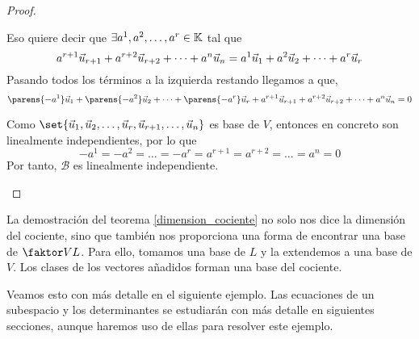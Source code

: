 \documentclass[../algebra_lineal.tex]{subfiles}
\begin{document}
\begin{proof}
\begin{enumerate}
        Eso quiere decir que $\exists {a}^{1}, {a}^{2}, \dots, {a}^{r} \in \mathbb{K}$ tal que
        \[
            a^{r+1}\vec{u}_{r+1} + a^{r+2}\vec{u}_{r+2} + \dots + a^{n}\vec{u}_{n} = {a}^{1}\vec{u}_{1}+{a}^{2}\vec{u}_{2}+\dots+{a}^{r}\vec{u}_{r}
        \] 
        Pasando todos los términos a la izquierda restando llegamos a que,
        \[
            \parens{-a^1}\vu_1 + \parens{-a^2}\vu_2 + \dots + \parens{-a^r}\vu_r + a^{r+1}\vu_{r+1} + a^{r+2}\vu_{r+2} + \dots + a^{n}\vu_{n} = 0
        \]

        Como $\set{\vlst{u}{r}, \vu_{r+1}, \dots, \vu_n}$ es base de $V$, entonces en concreto son linealmente independientes, por lo que
        \[
            -a^1=-a^2= \dots = -a^r=a^{r+1} = a^{r+2} = \dots = a^n = 0
        \]
        Por tanto, $\mathcal{B}$ es linealmente independiente.
    \end{enumerate}
\end{proof}

\begin{remark}
    La demostración del teorema \ref{dimension_cociente} no solo nos dice la dimensión del cociente, sino que también nos proporciona una forma de encontrar una base de $\qs{V}{L}$. Para ello, tomamos una base de $L$ y la extendemos a una base de $V$. Los clases de los vectores añadidos forman una base del cociente.
\end{remark}

Veamos esto con más detalle en el siguiente ejemplo. Las ecuaciones de un subespacio y los determinantes se estudiarán con más detalle en siguientes secciones, aunque haremos uso de ellas para resolver este ejemplo.
\end{document}
